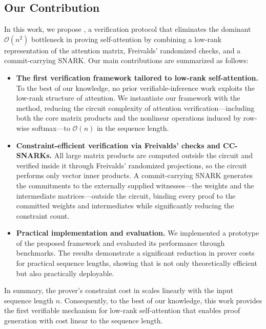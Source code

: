 \documentclass[sigconf,anonymous,review,balance=false]{acmart}
\newcommand{\rev}[1]{{\color{magenta}#1}}
\begin{document}
\subsection{Our Contribution}
In this work, we propose \name, a verification protocol that eliminates the dominant $\mathcal{O}(n^2)$ bottleneck in proving self-attention by combining a low-rank representation of the attention matrix, Freivalds’ randomized checks, and a commit-carrying SNARK. Our main contributions are summarized as follows:
\begin{itemize}
    \item \rev{\textbf{The first verification framework tailored to low-rank self-attention.} To the best of our knowledge, no prior verifiable-inference work exploits the low-rank structure of attention. We instantiate our framework with the \nystrom method, reducing the circuit complexity of attention verification---including both the core matrix products and the nonlinear operations induced by row-wise softmax---to $\mathcal{O}(n)$ in the sequence length.}
    \item \rev{\textbf{Constraint-efficient verification via Freivalds’ checks and CC-SNARKs.} All large matrix products are computed outside the circuit and verified inside it through Freivalds’ randomized projections, so the circuit performs only vector inner products. A commit-carrying SNARK generates the commitments to the externally supplied witnesses---the weights and the intermediate matrices---outside the circuit, binding every proof to the committed weights and intermediates while significantly reducing the constraint count.}
    \item \textbf{Practical implementation and evaluation.} We implemented a prototype of the proposed framework and evaluated its performance through benchmarks. The results demonstrate a significant reduction in prover costs for practical sequence lengths, showing that \name is not only theoretically efficient but also practically deployable.
\end{itemize}

In summary, the prover’s constraint cost in \name scales linearly with the input sequence length $n$. Consequently, to the best of our knowledge, this work provides the first verifiable mechanism for low-rank self-attention that enables proof generation with cost linear to the sequence length.



\end{document}
